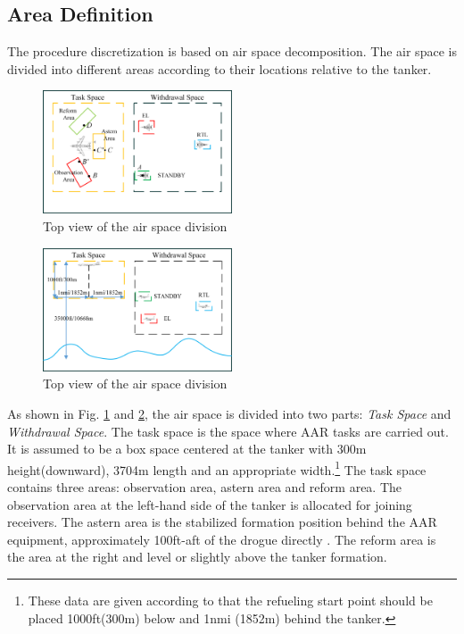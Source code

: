 \subsection{Area Definition}
The procedure discretization is based on air space decomposition. The air space is divided into different areas according to their locations relative to the tanker.
\begin{figure}[h]
	\begin{center}
		\includegraphics[width=0.5\textwidth]{Figures/Figs_Ch14/Fig5_AreaView_Top}
		\par\end{center}
	\caption{Top view of the air space division}
	\label{fig:topview} 
\end{figure}
\begin{figure}[h]
	\begin{center}
		\includegraphics[width=0.5\textwidth]{Figures/Figs_Ch14/Fig5_AreaView_Side}
		\par\end{center}
	\caption{Top view of the air space division}
	\label{fig:sideview} 
\end{figure}

As shown in Fig. \ref{fig:topview} and \ref{fig:sideview}, the air space is divided into two parts: \textit{Task Space} and \textit{Withdrawal Space}. The task space is the space where AAR tasks are carried out. It is assumed to be a box space centered at the tanker with 300m height(downward), 3704m length and an appropriate width.\footnote{These data are given according to \cite[p.~54]{NATO2010} that the refueling start point should be placed 1000ft(300m) below and 1nmi (1852m) behind the tanker.} The task space contains three areas: observation area, astern area and reform area. The observation area at the left-hand side of the tanker is allocated for joining receivers. The astern area is the stabilized formation position behind the AAR equipment, approximately 100ft-aft of the drogue directly \cite[p.~32]{NATO2010}. The reform area is the area at the right and level or slightly above the tanker formation.

